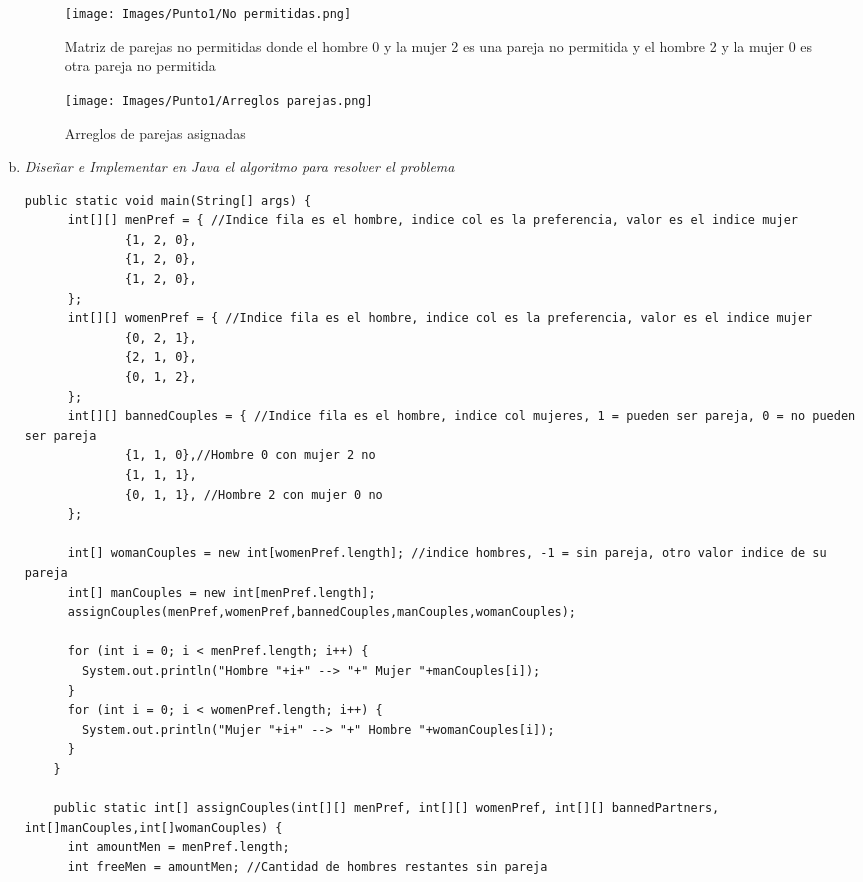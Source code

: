 \begin{enumerate}[a)]
  \begin{figure}[!htb]
    \centering
    \texttt{[image: Images/Punto1/No permitidas.png]}
    \caption{Matriz de parejas no permitidas donde el hombre 0 y la mujer 2 es una pareja no permitida y el hombre 2 y la mujer 0 es otra pareja no permitida }
    \label{fig:MatrizBan}
  \end{figure}

  \begin{figure}[!htb]
    \centering
    \texttt{[image: Images/Punto1/Arreglos parejas.png]}
    \caption{Arreglos de parejas asignadas}
    \label{fig:ArreglosParejas}
  \end{figure}
  \item \textit{Diseñar e Implementar en Java el algoritmo para resolver el problema}
  
  \begin{lstlisting}[style=java,caption= Implementacion problema de las parejas con asignaciones estables]
    public static void main(String[] args) {
      int[][] menPref = { //Indice fila es el hombre, indice col es la preferencia, valor es el indice mujer
              {1, 2, 0},
              {1, 2, 0}, 
              {1, 2, 0}, 
      };
      int[][] womenPref = { //Indice fila es el hombre, indice col es la preferencia, valor es el indice mujer
              {0, 2, 1}, 
              {2, 1, 0}, 
              {0, 1, 2},
      };
      int[][] bannedCouples = { //Indice fila es el hombre, indice col mujeres, 1 = pueden ser pareja, 0 = no pueden ser pareja
              {1, 1, 0},//Hombre 0 con mujer 2 no
              {1, 1, 1},
              {0, 1, 1}, //Hombre 2 con mujer 0 no
      };
      
      int[] womanCouples = new int[womenPref.length]; //indice hombres, -1 = sin pareja, otro valor indice de su pareja
      int[] manCouples = new int[menPref.length];
      assignCouples(menPref,womenPref,bannedCouples,manCouples,womanCouples);
  
      for (int i = 0; i < menPref.length; i++) {
        System.out.println("Hombre "+i+" --> "+" Mujer "+manCouples[i]);
      }
      for (int i = 0; i < womenPref.length; i++) {
        System.out.println("Mujer "+i+" --> "+" Hombre "+womanCouples[i]);
      }
    }
  
    public static int[] assignCouples(int[][] menPref, int[][] womenPref, int[][] bannedPartners, int[]manCouples,int[]womanCouples) {
      int amountMen = menPref.length;
      int freeMen = amountMen; //Cantidad de hombres restantes sin pareja
  

\end{lstlisting}
\end{enumerate}
